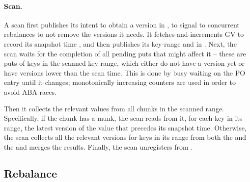 \paragraph{Scan.}
A scan first publishes its intent to obtain a version in , to 
signal to concurrent rebalances to not remove the versions it needs. It
fetches-and-increments GV to record its snapshot time ,  
and then publishes its key-range and  in .
Next, the scan waits for the completion of all pending puts  
that might affect it  -- these are puts of keys in the scanned key range, which either do not have a version yet or have versions lower than the scan time.
This is done by busy waiting on the PO entry until it changes; monotonically increasing counters are used 
in order to avoid ABA races. 

Then it collects the relevant values from all chunks in the scanned range.
Specifically, if the chunk has a munk, the scan reads from it, for each key in its range, 
the latest version of the value that precedes its snapshot time.
Otherwise, the scan collects all the relevant versions for keys in its range from both 
the    and the  and merges the results.
Finally, the scan unregisters from .

\subsection{Rebalance}
\label{ssec:rebalance}

